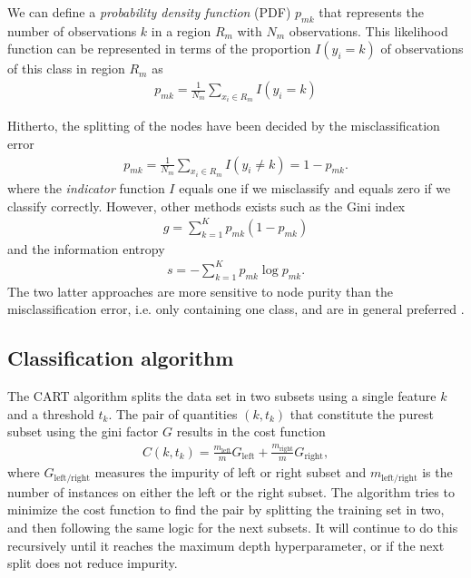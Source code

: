 We can define a \textit{probability density function} (PDF) $p_{mk}$ that represents the number of observations $k$ in a region $R_m$ with $N_m$ observations. This likelihood function can be represented in terms of the proportion $I(y_i = k)$ of observations of this class in region $R_m$ as
\begin{align}
  p_{mk} = \frac{1}{N_m} \sum_{x_i \in R_m} I(y_i = k)
\end{align}

Hitherto, the splitting of the nodes have been decided by the misclassification error
\begin{align}
  p_{mk} = \frac{1}{N_m} \sum_{x_i \in R_m} I(y_i \neq k) = 1 - p_{mk}.
\end{align}
where the \textit{indicator} function $I$ equals one if we misclassify and equals zero if we classify correctly. However, other methods exists such as the Gini index
\begin{align}
  g = \sum_{k=1}^{K} p_{mk} (1-p_{mk})
\end{align}
and the information entropy
\begin{align}
  s = - \sum_{k=1}^{K} p_{mk} \log p_{mk}.
\end{align}
The two latter approaches are more sensitive to node purity than the misclassification error, i.e. only containing one class, and are in general preferred \cite{Murphy2012}.

\subsection{Classification algorithm}
The CART algorithm splits the data set in two subsets using a single feature $k$ and a threshold $t_k$. The pair of quantities $(k,t_k)$ that constitute the purest subset using the gini factor $G$ results in the cost function
\begin{align}
  C(k, t_k) = \frac{m_{\text{left}}}{m}G_{\text{left}} + \frac{m_{\text{right}}}{m}G_{\text{right}},
\end{align}
where $G_{\text{left} / \text{right}}$ measures the impurity of left or right subset and $m_{\text{left} / \text{right}}$ is the number of instances on either the left or the right subset. The algorithm tries to minimize the cost function to find the pair by splitting the training set in two, and then following the same logic for the next subsets. It will continue to do this recursively until it reaches the maximum depth hyperparameter, or if the next split does not reduce impurity.

